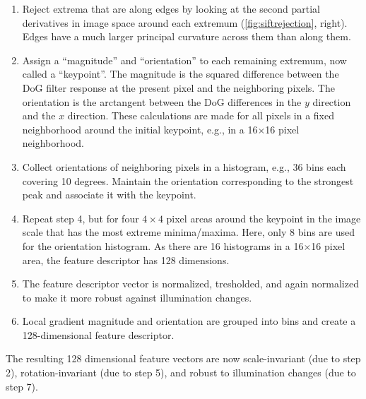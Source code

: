 \begin{enumerate}
\begin{enumerate}
\item Reject extrema that are along edges by looking at the second partial derivatives in image space around each extremum (\cref{fig:siftrejection}, right). Edges have a much larger principal curvature across them than along them.
\item Assign a ``magnitude'' and ``orientation'' to each remaining extremum, now called a ``keypoint''. The magnitude is the squared difference between the DoG filter response at the present pixel and the neighboring pixels. The orientation is the arctangent between the DoG differences in the $y$ direction and the $x$ direction. These calculations are made for all pixels in a fixed neighborhood around the initial keypoint, e.g., in a 16$\times$16 pixel neighborhood.
\item Collect orientations of neighboring pixels in a histogram, e.g., 36 bins each covering 10 degrees. Maintain the orientation corresponding to the strongest peak and associate it with the keypoint.
\item Repeat step 4, but for four $4\times4$ pixel areas around the keypoint in the image scale that has the most extreme minima/maxima. Here, only 8 bins are used for the orientation histogram. As there are 16 histograms in a 16$\times$16 pixel area, the feature descriptor has 128 dimensions.
\item The feature descriptor vector is normalized, tresholded, and again normalized to make it more robust against illumination changes.
\item Local gradient magnitude and orientation are grouped into bins and create a 128-dimensional feature descriptor.
\end{enumerate}

The resulting 128 dimensional feature vectors are now scale-invariant (due to step 2), rotation-invariant (due to step 5), and robust to illumination changes (due to step 7).


\end{enumerate}
